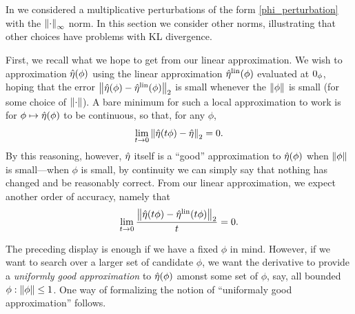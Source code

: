 In  we considered a multiplicative perturbations
of the form \eqref{phi_perturbation} with the $\left\Vert\cdot\right\Vert_{\infty}$ norm.  In
this section we consider other norms, illustrating that other choices
have problems with KL divergence.

First, we recall what we hope to get from our linear approximation.  We wish to
approximation $\hat\eta(\phi)$ using the linear approximation $\hat\eta^{\mathrm{lin}}(\phi)$
evaluated at $0_\phi$, hoping that the error $\left\Vert\hat\eta(\phi) -
\hat\eta^{\mathrm{lin}}(\phi)\right\Vert_2$ is small whenever the $\left\Vert\phi\right\Vert$ is small (for some choice
of $\left\Vert\cdot\right\Vert$).  A bare minimum for such a local approximation to work is
for $\phi \mapsto \hat\eta(\phi)$ to be continuous, so that, for any
$\phi$,
%
\begin{align*}
%
\lim_{t \rightarrow 0} \norm{\etaopt(t \phi) - \etaopt}_2 = 0.
%
\end{align*}
%
By this reasoning, however, $\hat\eta$ itself is a ``good'' approximation to
$\hat\eta(\phi)$ when $\left\Vert\phi\right\Vert$ is small---when $\phi$ is small, by
continuity we can simply say that nothing has changed and be reasonably correct.
From our linear approximation, we expect another order of accuracy, namely that
%
\begin{align*}
%
\lim_{t \rightarrow 0} \frac{\norm{\etaopt(t \phi) - \etalin(t\phi)}_2}{t} = 0.
%
\end{align*}

The preceding display is enough if we have a fixed $\phi$ in mind.  However, if
we want to search over a larger set of candidate $\phi$, we want the derivative
to provide a {\em uniformly good approximation} to $\hat\eta(\phi)$ amonst some
set of $\phi$, say, all bounded $\phi: \left\Vert\phi\right\Vert \le 1$.  One way of
formalizing the notion of ``uniformaly good approximation'' follows.

